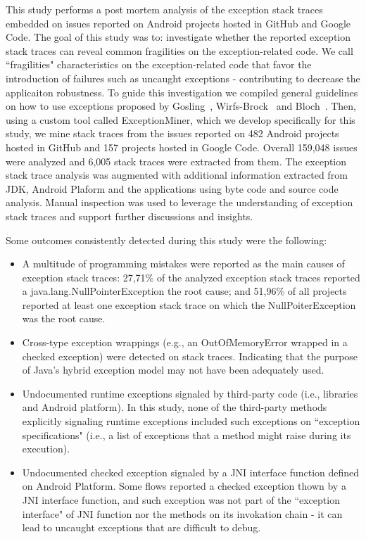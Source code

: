 \documentclass[conference]{IEEEtran}
\begin{document}
This study performs a post mortem analysis of the exception stack traces embedded on issues
reported on Android projects hosted in GitHub and Google Code. 
The goal of this study was to: investigate whether the reported exception stack traces
 can reveal common fragilities on the exception-related code.  
We call ``fragilities" characteristics on the exception-related code 
that favor the introduction of failures such as uncaught 
exceptions -  contributing to decrease the applicaiton robustness.
To guide this investigation we compiled general guidelines on how to use
exceptions proposed by Gosling~\cite{gosling2000java},
Wirfs-Brock~\cite{wirfs2006toward} and Bloch~\cite{bloch2008effective}.
Then, using a custom tool called ExceptionMiner,
 which we develop specifically for this study, we mine stack traces from the issues reported 
on 482 Android projects hosted in GitHub and 157 projects hosted in Google Code.
Overall 159,048 issues were analyzed and 6,005 stack traces were extracted from them.
The exception stack trace analysis was augmented with additional information
extracted from JDK, Android Plaform and the applications using byte code 
and source code analysis. Manual inspection was used to leverage the understanding 
of exception stack traces and support further discussions and insights.

Some outcomes consistently detected during this study were the following:

\begin{itemize}

 \item  A multitude of programming mistakes were reported as the main causes of exception stack traces:
 27,71\% of the analyzed exception stack traces reported a java.lang.NullPointerException the root cause;
and  51,96\% of all projects reported at least one exception stack trace on which the NullPoiterException
was the root cause.

   \item  Cross-type exception wrappings (e.g., an OutOfMemoryError wrapped in a checked exception)
were detected on stack traces. Indicating that the purpose of Java's hybrid exception model may not have been adequately used.

   \item Undocumented runtime exceptions signaled by third-party code (i.e., libraries and Android platform). 
    In this study, none of the third-party methods explicitly signaling runtime exceptions included such exceptions
    on ``exception specifications" (i.e., a list of exceptions that a method might raise during its execution). 

   \item Undocumented checked exception signaled by a  JNI interface function defined on Android Platform. 
    Some flows reported a checked exception thown by a JNI interface function, and  such exception was not  
    part of the ``exception interface" of JNI function nor the methods on its invokation chain - it can lead to 
   uncaught exceptions that are difficult to debug. 

\end{itemize}
\end{document}
